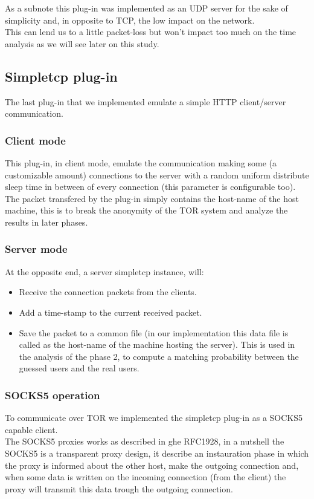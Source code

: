 As a subnote this plug-in was implemented as an UDP server for the sake of
simplicity and, in opposite to TCP, the low impact on the network.\\
This can lend us to a little packet-loss but won't impact too much on the time analysis
as we will see later on this study.

\subsection{Simpletcp plug-in}
\label{subsec:simpletcp}
The last plug-in that we implemented emulate a simple HTTP client/server communication.
\subsubsection {Client mode}
\label{sec:simpletcpclient}
This plug-in, in client mode, emulate the communication making some (a customizable amount)
connections to the server
with a random uniform distribute sleep time in between of every connection
(this parameter is configurable too).\\
The packet transfered by the plug-in simply contains the host-name of the
host machine, this is to break the anonymity of the TOR system and analyze the results
in later phases.\\
\subsubsection {Server mode}
At the opposite end, a server simpletcp instance, will:
\begin{itemize}
	\item Receive the connection packets from the clients.
	\item Add a time-stamp to the current received packet.
	\item Save the packet to a common file (in our implementation this data
	file is called as the host-name of the machine hosting the server).
	This is used in the analysis of the phase 2, to compute a matching probability
	between the guessed users and the real users.
\end{itemize}


\subsubsection {SOCKS5 operation}
To communicate over TOR we implemented the simpletcp plug-in as a SOCKS5 capable
client.\\
The SOCKS5 proxies works as described in ghe RFC1928\cite{leech1996rfc},
in a nutshell the SOCKS5 is a transparent proxy design, it describe an instauration
phase in which the proxy is informed about the other host, make the outgoing connection
and, when some data is written on the incoming connection (from the client)
the proxy will transmit this data trough the outgoing connection.\\


